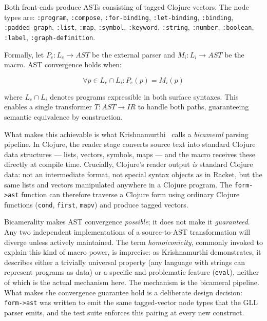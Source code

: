 \documentclass[conference]{IEEEtran}
\begin{document}
Both front-ends produce ASTs consisting of tagged Clojure vectors. The node types are: \texttt{:program}, \texttt{:compose}, \texttt{:for-binding}, \texttt{:let-binding}, \texttt{:binding}, \texttt{:padded-graph}, \texttt{:list}, \texttt{:map}, \texttt{:symbol}, \texttt{:keyword}, \texttt{:string}, \texttt{:number}, \texttt{:boolean}, \texttt{:label}, \texttt{:graph-definition}.

Formally, let $P_e : L_e \rightarrow AST$ be the external parser and $M_i : L_i \rightarrow AST$ be the macro. AST convergence holds when:

\begin{equation}
\forall p \in L_e \cap L_i : P_e(p) = M_i(p)
\end{equation}

where $L_e \cap L_i$ denotes programs expressible in both surface syntaxes. This enables a single transformer $T : AST \rightarrow IR$ to handle both paths, guaranteeing semantic equivalence by construction.

What makes this achievable is what Krishnamurthi~\cite{krishnamurthi} calls a \emph{bicameral} parsing pipeline. In Clojure, the reader stage converts source text into standard Clojure data structures --- lists, vectors, symbols, maps --- and the macro receives these directly at compile time. Crucially, Clojure's reader output \emph{is} standard Clojure data: not an intermediate format, not special syntax objects as in Racket, but the same lists and vectors manipulated anywhere in a Clojure program. The \texttt{form->ast} function can therefore traverse a Clojure form using ordinary Clojure functions (\texttt{cond}, \texttt{first}, \texttt{mapv}) and produce tagged vectors.

Bicamerality makes AST convergence \emph{possible}; it does not make it \emph{guaranteed}. Any two independent implementations of a source-to-AST transformation will diverge unless actively maintained. The term \emph{homoiconicity}, commonly invoked to explain this kind of macro power, is imprecise: as Krishnamurthi demonstrates, it describes either a trivially universal property (any language with strings can represent programs as data) or a specific and problematic feature (\texttt{eval}), neither of which is the actual mechanism here. The mechanism is the bicameral pipeline. What makes the convergence guarantee hold is a deliberate design decision: \texttt{form->ast} was written to emit the same tagged-vector node types that the GLL parser emits, and the test suite enforces this pairing at every new construct.
\end{document}
